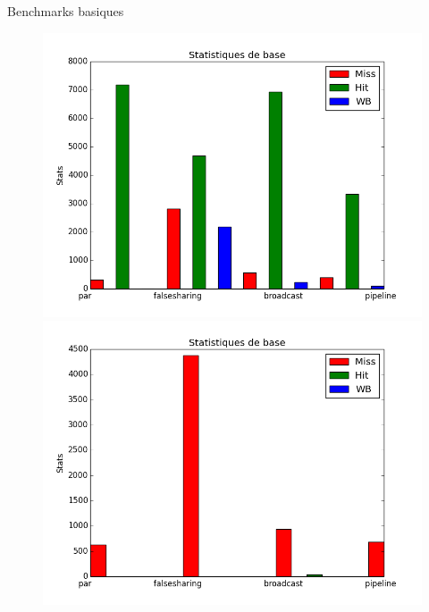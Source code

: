 \begin{frame}{Benchmarks basiques}
\begin{figure}[H]
   \begin{minipage}[l]{.46\textwidth}
     \includegraphics[scale=0.22]{images/stats_L1.png}
   \end{minipage} \hfill
   \begin{minipage}[r]{.46\textwidth}
     \includegraphics[scale=0.22]{images/stats_L2.png}
   \end{minipage}
\end{figure}


\end{frame}
